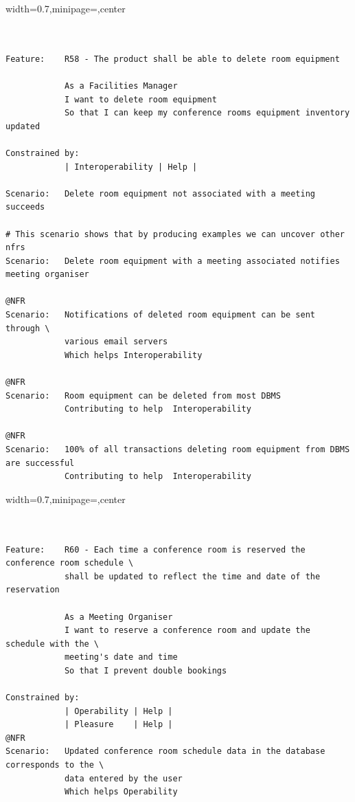 \documentclass[dissertation,final]{softeng}
\newenvironment{featurecode}[1]
{ \lrbox\featurebox \begin{adjustbox}{width=#1\textwidth,minipage=\textwidth,center} }
{ \end{adjustbox}\endlrbox}
\newenvironment{featurelist}[2]
{
\newcommand{\setcaption}{\caption{#1}}
\newcommand{\setlabel}{\label{#2}}
}
{\begin{listing}[h!]\centering\usebox\featurebox\setcaption\setlabel\end{listing}}
\begin{document}
\begin{appendices}
\begin{featurelist}{R58 -- The product shall be able to delete room equipment}{lst:feature_r58}
\begin{featurecode}{0.7}
\begin{verbatim}


Feature:    R58 - The product shall be able to delete room equipment

            As a Facilities Manager
            I want to delete room equipment
            So that I can keep my conference rooms equipment inventory updated
	
Constrained by:
            | Interoperability | Help |

Scenario:   Delete room equipment not associated with a meeting succeeds

# This scenario shows that by producing examples we can uncover other nfrs
Scenario:   Delete room equipment with a meeting associated notifies meeting organiser

@NFR
Scenario:   Notifications of deleted room equipment can be sent through \
            various email servers	
            Which helps Interoperability

@NFR	
Scenario:   Room equipment can be deleted from most DBMS
            Contributing to help  Interoperability

@NFR
Scenario:   100% of all transactions deleting room equipment from DBMS are successful
            Contributing to help  Interoperability
\end{verbatim}
\end{featurecode}
\end{featurelist}
\clearpage

\begin{featurelist}{R60 -- Each time a conference room is reserved the schedule shall be updated}{lst:feature_r60}
\begin{featurecode}{0.7}
\begin{verbatim}


Feature:    R60 - Each time a conference room is reserved the conference room schedule \
            shall be updated to reflect the time and date of the reservation

            As a Meeting Organiser
            I want to reserve a conference room and update the schedule with the \
            meeting's date and time
            So that I prevent double bookings

Constrained by:
            | Operability | Help |
            | Pleasure    | Help |
@NFR	
Scenario:   Updated conference room schedule data in the database corresponds to the \
            data entered by the user
            Which helps Operability


\end{verbatim}
\end{featurecode}
\end{featurelist}
\end{appendices}
\end{document}
